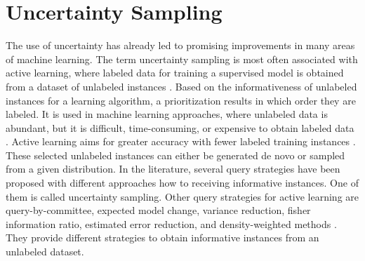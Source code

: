 \section{Uncertainty Sampling} 
\label{sec:uncertaintysampling}
%
The use of uncertainty has already led to promising improvements in many areas of machine learning.
The term uncertainty sampling is most often associated with active learning, where labeled data for training a supervised model is obtained from a dataset of unlabeled instances \cite{Settles2009ActiveLL}.
Based on the informativeness of unlabeled instances for a learning algorithm, a prioritization results in which order they are labeled.
It is used in machine learning approaches, where unlabeled data is abundant, but it is difficult, time-consuming, or expensive to obtain labeled data \cite{Settles2009ActiveLL}.
Active learning aims for greater accuracy with fewer labeled training instances \cite{Settles2009ActiveLL}.
These selected unlabeled instances can either be generated de novo or sampled from a given distribution.
In the literature, several query strategies have been proposed with different approaches how to receiving informative instances.
One of them is called uncertainty sampling.
Other query strategies for active learning are query-by-committee, expected model change, variance reduction, fisher information ratio, estimated error reduction, and density-weighted methods \cite{Settles2009ActiveLL}.
They provide different strategies to obtain informative instances from an unlabeled dataset.

